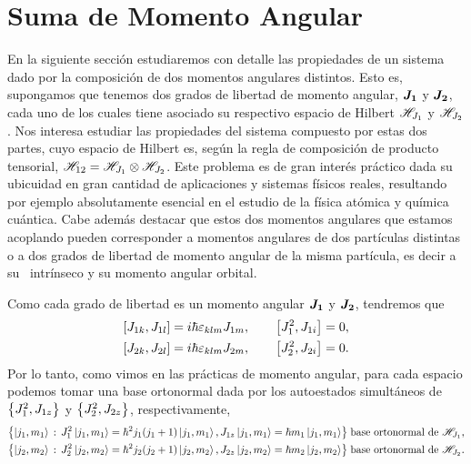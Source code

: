 \documentclass[10pt, a4paper]{article}
\numberwithin{equation}{subsection}
\begin{document}
\section{Suma de Momento Angular}

En la siguiente sección estudiaremos con detalle las propiedades de un sistema
dado por la composición de dos momentos angulares distintos. Esto es,
supongamos que tenemos dos grados de libertad de momento angular, $\vb*{J_1}$
y $\vb*{J_2}$, cada uno de los cuales tiene asociado su respectivo espacio de
Hilbert $\mathscr{H}_{J_1}$ y $\mathscr{H}_{J_2}$. Nos interesa estudiar las
propiedades del sistema compuesto por estas dos partes, cuyo espacio de Hilbert
es, según la regla de composición de producto tensorial, $\mathscr{H}_{12} =
\mathscr{H}_{J_1}\otimes\mathscr{H}_{J_2}$. Este problema es de gran interés práctico
dada su ubicuidad en gran cantidad de aplicaciones y sistemas físicos reales,
resultando por ejemplo absolutamente esencial en el estudio de la física atómica
y química cuántica. Cabe además destacar que estos dos momentos angulares que
estamos acoplando pueden corresponder a momentos angulares de dos partículas
distintas o a dos grados de libertad de momento angular de la misma partícula,
es decir a su \spin~intrínseco y su momento angular orbital.

Como cada grado de libertad es un momento angular $\vb*{J_1}$ y $\vb*{J_2}$,
tendremos que
\begin{align}
  \comm{J_{1k}}{J_{1l}} &= i\hbar\lchivita_{klm}J_{1m}, \qquad
    \comm{J_1^2}{J_{1i}} = 0, \\
  \comm{J_{2k}}{J_{2l}} &= i\hbar\lchivita_{klm}J_{2m}, \qquad
    \comm{J_2^2}{J_{2i}} = 0.
\end{align}
Por lo tanto, como vimos en las prácticas de momento angular, para cada espacio
podemos tomar una base ortonormal dada por los autoestados simultáneos de
$\set{J_1^2, J_{1z}}$ y $\set{J_2^2, J_{2z}}$, respectivamente,
\begin{align}
  \set{\ket{j_1,m_1}\,:\,J_1^2\ket{j_1,m_1} = \hbar^2j_1(j_1+1)\ket{j_1,m_1},
    J_{1z}\ket{j_1,m_1} = \hbar m_1\ket{j_1,m_1}} \;
    \text{base ortonormal de } \Hilbert_{J_1}, \\
  \set{\ket{j_2,m_2}\,:\,J_2^2\ket{j_2,m_2} = \hbar^2j_2(j_2+1)\ket{j_2,m_2},
    J_{2z}\ket{j_2,m_2} = \hbar m_2\ket{j_2,m_2}} \;
    \text{base ortonormal de } \Hilbert_{J_2}.
\end{align}
\end{document}
